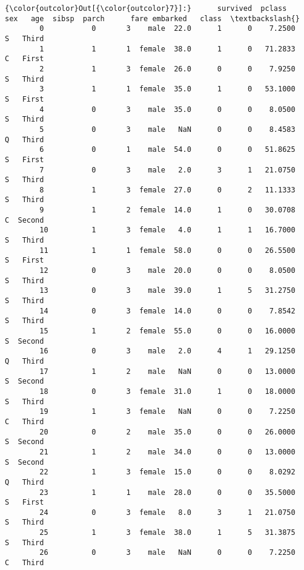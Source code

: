 \documentclass[11pt]{article}
\begin{document}
\begin{Verbatim}[commandchars=\\\{\}]
{\color{outcolor}Out[{\color{outcolor}7}]:}      survived  pclass     sex   age  sibsp  parch      fare embarked   class  \textbackslash{}
        0           0       3    male  22.0      1      0    7.2500        S   Third   
        1           1       1  female  38.0      1      0   71.2833        C   First   
        2           1       3  female  26.0      0      0    7.9250        S   Third   
        3           1       1  female  35.0      1      0   53.1000        S   First   
        4           0       3    male  35.0      0      0    8.0500        S   Third   
        5           0       3    male   NaN      0      0    8.4583        Q   Third   
        6           0       1    male  54.0      0      0   51.8625        S   First   
        7           0       3    male   2.0      3      1   21.0750        S   Third   
        8           1       3  female  27.0      0      2   11.1333        S   Third   
        9           1       2  female  14.0      1      0   30.0708        C  Second   
        10          1       3  female   4.0      1      1   16.7000        S   Third   
        11          1       1  female  58.0      0      0   26.5500        S   First   
        12          0       3    male  20.0      0      0    8.0500        S   Third   
        13          0       3    male  39.0      1      5   31.2750        S   Third   
        14          0       3  female  14.0      0      0    7.8542        S   Third   
        15          1       2  female  55.0      0      0   16.0000        S  Second   
        16          0       3    male   2.0      4      1   29.1250        Q   Third   
        17          1       2    male   NaN      0      0   13.0000        S  Second   
        18          0       3  female  31.0      1      0   18.0000        S   Third   
        19          1       3  female   NaN      0      0    7.2250        C   Third   
        20          0       2    male  35.0      0      0   26.0000        S  Second   
        21          1       2    male  34.0      0      0   13.0000        S  Second   
        22          1       3  female  15.0      0      0    8.0292        Q   Third   
        23          1       1    male  28.0      0      0   35.5000        S   First   
        24          0       3  female   8.0      3      1   21.0750        S   Third   
        25          1       3  female  38.0      1      5   31.3875        S   Third   
        26          0       3    male   NaN      0      0    7.2250        C   Third   

\end{Verbatim}
\end{document}
